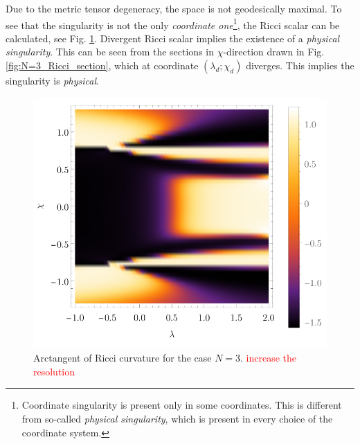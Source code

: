 Due to the metric tensor degeneracy, the space is not geodesically maximal. To see that the singularity is not the only \emph{coordinate one}\footnote{Coordinate singularity is present only in some coordinates. This is different from so-called \emph{physical singularity}, which is present in every choice of the coordinate system.}, the Ricci scalar can be calculated, see Fig. \ref{fig:N=3_Ricci}. Divergent Ricci scalar implies the existence of a \emph{physical singularity}. This can be seen from the sections in $\chi$-direction drawn in Fig. \ref{fig:N=3_Ricci_section}, which at coordinate $(\lambda_d;\chi_d)$ diverges. This implies the singularity is \emph{physical}. 




\begin{figure}[H]
    \centering
    \includegraphics{../img/N=3_Ricci.pdf}
    \caption{Arctangent of Ricci curvature for the case $N=3$. \textcolor{red}{increase the resolution}}
    \label{fig:N=3_Ricci}
\end{figure}

